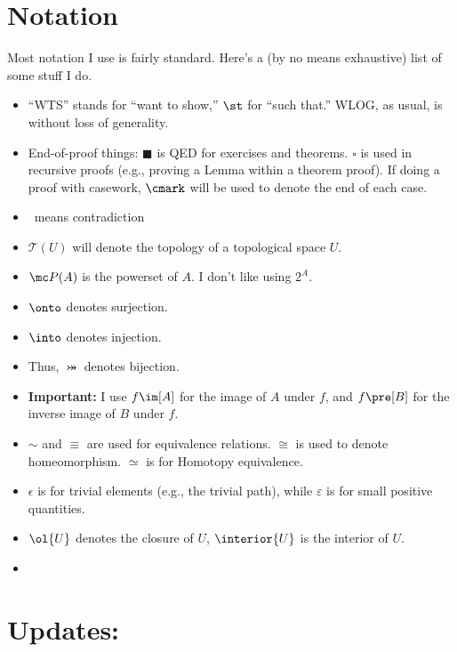 \documentclass{fkbook}
\begin{document}
\section*{Notation}
Most notation I use is fairly standard. Here's a (by no means exhaustive) list
of some stuff I do.
\begin{itemize}
  \item ``WTS'' stands for ``want to show,'' $\st$ for ``such that.'' WLOG, as
    usual, is without loss of generality.
  \item End-of-proof things: $\blacksquare$ is QED for exercises and theorems.
    $\square$ is used in recursive proofs (e.g., proving a Lemma within a
    theorem proof). If doing a proof with casework, $\cmark$ will be used to
    denote the end of each case.
  \item \contra\ means contradiction
  \item $\mathscr{T}(U)$ will denote the topology of a topological space $U$.
  \item $\mc P(A)$ is the powerset of $A$. I don't like using $2^A$.
  \item $\onto$ denotes surjection.
  \item $\into$ denotes injection.
  \item Thus, $\bij$ denotes bijection.
  \item \textbf{Important:} I use $f\im[A]$ for the image of $A$ under $f$, and
    $f\pre[B]$ for the inverse image of $B$ under $f$.
  \item $\sim$ and $\equiv$ are used for equivalence relations. $\cong$ is used
    to denote homeomorphism. $\simeq$ is for Homotopy equivalence.
  \item $\epsilon$ is for trivial elements (e.g., the trivial path), while
    $\varepsilon$ is for small positive quantities.
  \item $\ol{U}$ denotes the closure of $U$, $\interior{U}$ is the interior of
    $U$.
  \item
\end{itemize}

\section*{Updates:}
\end{document}
